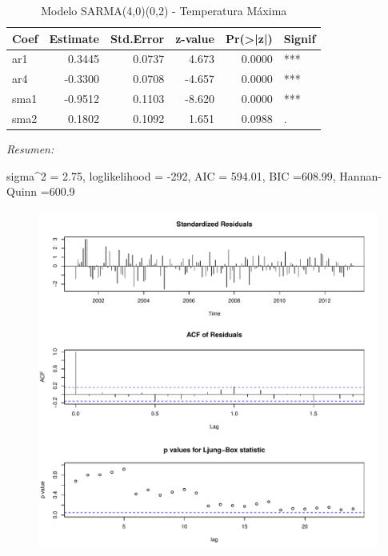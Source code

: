 \documentclass[12pt,oneside]{book}\usepackage[]{graphicx}\usepackage[]{color}
\makeatletter
\def\maxwidth{ %
  \ifdim\Gin@nat@width>\linewidth
    \linewidth
  \else
    \Gin@nat@width
  \fi
}
\newenvironment{knitrout}{}{} %
\theoremstyle{definition} %
\makeatother
\begin{document}
\begin{enumerate}
\begin{knitrout}
\begin{table}
\caption{\label{tab:model_x2}\label{tab:sarma_tmax}Modelo SARMA(4,0)(0,2) - Temperatura Máxima}
\centering
\begin{threeparttable}
\begin{tabular}[t]{lrrrrl}
\toprule
Coef & Estimate & Std.Error & z-value & Pr(>|z|) & Signif\\
\midrule
\rowcolor{gray!6}  ar1 & 0.3445 & 0.0737 & 4.673 & 0.0000 & ***\\
ar4 & -0.3300 & 0.0708 & -4.657 & 0.0000 & ***\\
\rowcolor{gray!6}  sma1 & -0.9512 & 0.1103 & -8.620 & 0.0000 & ***\\
sma2 & 0.1802 & 0.1092 & 1.651 & 0.0988 & .\\
\bottomrule
\end{tabular}
\begin{tablenotes}
\item \textit{Resumen:} 
\item sigma\textasciicircum{}2 = 2.75, loglikelihood = -292, AIC = 594.01, BIC =608.99, Hannan-Quinn =600.9
\end{tablenotes}
\end{threeparttable}
\end{table}


\end{knitrout}






\begin{knitrout}
\color{fgcolor}\begin{figure}[H]

{\centering \includegraphics[width=\maxwidth]{figure/unnamed-chunk-36-1} 

}
\end{figure}
\end{knitrout}
\end{enumerate}
\end{document}
